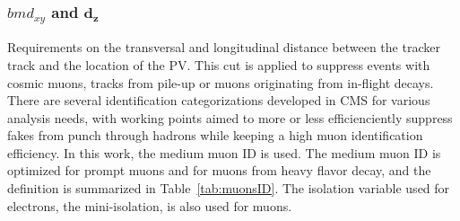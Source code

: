 \subsubsection*{$bm{d_{xy}}$ and $\bm{d_{z}}$}
\noindent\justify
Requirements on the transversal and longitudinal distance between the tracker track and the location of the PV. 
This cut is applied to suppress events with cosmic muons, tracks from pile-up or muons originating from in-flight decays.
\newpara
\noindent\justify  
There are several identification categorizations developed in CMS for various analysis needs, with working points aimed to more or less efficienciently suppress fakes from punch through hadrons while keeping a high muon identification efficiency.
In this work, the medium muon ID is used. The medium muon ID is optimized for prompt muons and for muons from heavy flavor decay, and the definition is summarized in Table~\ref{tab:muonsID}. 
The isolation variable used for electrons, the mini-isolation, is also used for muons. 
